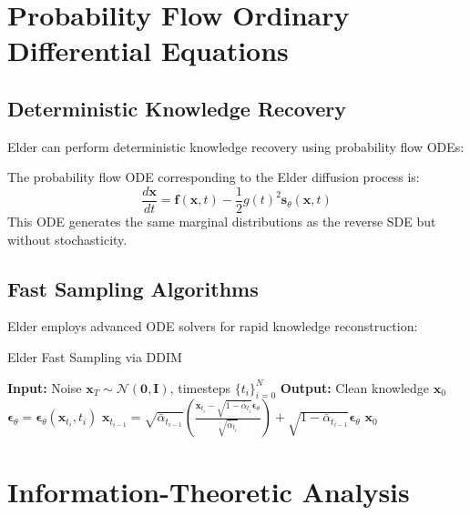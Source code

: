 \section{Probability Flow Ordinary Differential Equations}

\subsection{Deterministic Knowledge Recovery}

Elder can perform deterministic knowledge recovery using probability flow ODEs:

\begin{definition}
The probability flow ODE corresponding to the Elder diffusion process is:
\begin{equation}
\frac{d\mathbf{x}}{dt} = \mathbf{f}(\mathbf{x}, t) - \frac{1}{2} g(t)^2 \mathbf{s}_\theta(\mathbf{x}, t)
\end{equation}
This ODE generates the same marginal distributions as the reverse SDE but without stochasticity.
\end{definition}

\subsection{Fast Sampling Algorithms}

Elder employs advanced ODE solvers for rapid knowledge reconstruction:

\begin{algorithm}[H]
\caption{Elder Fast Sampling via DDIM}
\begin{algorithmic}[1]
\STATE \textbf{Input:} Noise $\mathbf{x}_T \sim \mathcal{N}(\mathbf{0}, \mathbf{I})$, timesteps $\{t_i\}_{i=0}^N$
\STATE \textbf{Output:} Clean knowledge $\mathbf{x}_0$
    \STATE $\boldsymbol{\epsilon}_\theta = \boldsymbol{\epsilon}_\theta(\mathbf{x}_{t_i}, t_i)$
    \STATE $\mathbf{x}_{t_{i-1}} = \sqrt{\bar{\alpha}_{t_{i-1}}} \left( \frac{\mathbf{x}_{t_i} - \sqrt{1-\bar{\alpha}_{t_i}} \boldsymbol{\epsilon}_\theta}{\sqrt{\bar{\alpha}_{t_i}}} \right) + \sqrt{1-\bar{\alpha}_{t_{i-1}}} \boldsymbol{\epsilon}_\theta$
\ENDFOR
\RETURN $\mathbf{x}_0$
\end{algorithmic}
\end{algorithm}

\section{Information-Theoretic Analysis}

